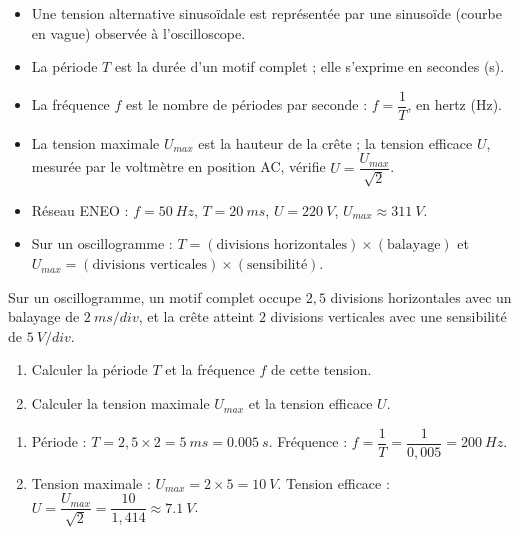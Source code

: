 \documentclass[11pt]{article}
\newcommand{\cle}[1]{{\popxbold\color{popdark}#1}}
\begin{document}
\begin{aretenir}
\begin{itemize}
\item Une tension alternative sinusoïdale est représentée par une \cle{sinusoïde} (courbe en vague) observée à l'\cle{oscilloscope}.
\item La \cle{période} $T$ est la durée d'un motif complet ; elle s'exprime en secondes (s).
\item La \cle{fréquence} $f$ est le nombre de périodes par seconde : $f = \dfrac{1}{T}$, en hertz (Hz).
\item La \cle{tension maximale} $U_{max}$ est la hauteur de la crête ; la \cle{tension efficace} $U$, mesurée par le voltmètre en position AC, vérifie $U = \dfrac{U_{max}}{\sqrt{2}}$.
\item Réseau ENEO : $f = \SI{50}{Hz}$, $T = \SI{20}{ms}$, $U = \SI{220}{V}$, $U_{max} \approx \SI{311}{V}$.
\item Sur un oscillogramme : $T = (\text{divisions horizontales}) \times (\text{balayage})$ et $U_{max} = (\text{divisions verticales}) \times (\text{sensibilité})$.
\end{itemize}
\end{aretenir}

\begin{exercice}
Sur un oscillogramme, un motif complet occupe $2,5$ divisions horizontales avec un balayage de $\SI{2}{ms/div}$, et la crête atteint $2$ divisions verticales avec une sensibilité de $\SI{5}{V/div}$.
\begin{enumerate}
\item Calculer la période $T$ et la fréquence $f$ de cette tension.
\item Calculer la tension maximale $U_{max}$ et la tension efficace $U$.
\end{enumerate}
\end{exercice}

\begin{corrige}
\begin{enumerate}
\item Période : $T = 2,5 \times 2 = \SI{5}{ms} = \SI{0,005}{s}$. Fréquence : $f = \dfrac{1}{T} = \dfrac{1}{0,005} = \SI{200}{Hz}$.
\item Tension maximale : $U_{max} = 2 \times 5 = \SI{10}{V}$. Tension efficace : $U = \dfrac{U_{max}}{\sqrt{2}} = \dfrac{10}{1,414} \approx \SI{7,1}{V}$.
\end{enumerate}
\end{corrige}
\end{document}
